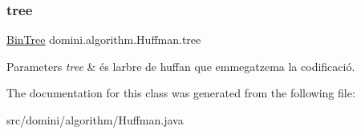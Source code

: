 \subsubsection{\texorpdfstring{tree}{tree}}
{\footnotesize\ttfamily \hyperlink{classdomini_1_1utils_1_1BinTree}{Bin\+Tree} domini.\+algorithm.\+Huffman.\+tree\hspace{0.3cm}{\ttfamily [private]}}


\begin{DoxyParams}{Parameters}
{\em tree} & és l\textquotesingle{}arbre de huffan que emmegatzema la codificació. \\
\hline
\end{DoxyParams}


The documentation for this class was generated from the following file\+:\begin{DoxyCompactItemize}
\item 
src/domini/algorithm/Huffman.\+java\end{DoxyCompactItemize}
